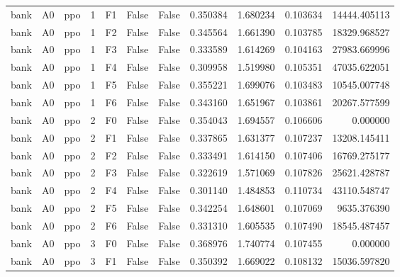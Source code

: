 \begin{tabular}{lllrlllrrrr}
      bank &      A0 &       ppo &     1 &  F1 &           False &            False &  0.350384 &  1.680234 & 0.103634 &     14444.405113 \\
      bank &      A0 &       ppo &     1 &  F2 &           False &            False &  0.345564 &  1.661390 & 0.103785 &     18329.968527 \\
      bank &      A0 &       ppo &     1 &  F3 &           False &            False &  0.333589 &  1.614269 & 0.104163 &     27983.669996 \\
      bank &      A0 &       ppo &     1 &  F4 &           False &            False &  0.309958 &  1.519980 & 0.105351 &     47035.622051 \\
      bank &      A0 &       ppo &     1 &  F5 &           False &            False &  0.355221 &  1.699076 & 0.103483 &     10545.007748 \\
      bank &      A0 &       ppo &     1 &  F6 &           False &            False &  0.343160 &  1.651967 & 0.103861 &     20267.577599 \\
      bank &      A0 &       ppo &     2 &  F0 &           False &            False &  0.354043 &  1.694557 & 0.106606 &         0.000000 \\
      bank &      A0 &       ppo &     2 &  F1 &           False &            False &  0.337865 &  1.631377 & 0.107237 &     13208.145411 \\
      bank &      A0 &       ppo &     2 &  F2 &           False &            False &  0.333491 &  1.614150 & 0.107406 &     16769.275177 \\
      bank &      A0 &       ppo &     2 &  F3 &           False &            False &  0.322619 &  1.571069 & 0.107826 &     25621.428787 \\
      bank &      A0 &       ppo &     2 &  F4 &           False &            False &  0.301140 &  1.484853 & 0.110734 &     43110.548747 \\
      bank &      A0 &       ppo &     2 &  F5 &           False &            False &  0.342254 &  1.648601 & 0.107069 &      9635.376390 \\
      bank &      A0 &       ppo &     2 &  F6 &           False &            False &  0.331310 &  1.605535 & 0.107490 &     18545.487457 \\
      bank &      A0 &       ppo &     3 &  F0 &           False &            False &  0.368976 &  1.740774 & 0.107455 &         0.000000 \\
      bank &      A0 &       ppo &     3 &  F1 &           False &            False &  0.350392 &  1.669022 & 0.108132 &     15036.597820 \\

\end{tabular}
